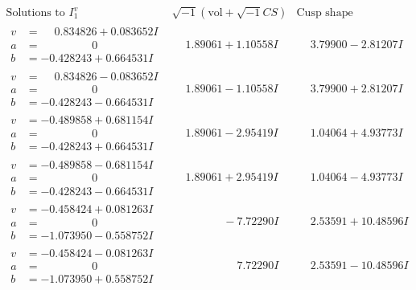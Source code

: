 \documentclass[1p]{elsarticle_modified}
\theoremstyle{definition}
\newcommand{\I}{\sqrt{-1}}
\begin{document}
$$\begin{array}{c|c|c}  
\text{Solutions to }I^v_{1}& \I (\text{vol} + \sqrt{-1}CS) & \text{Cusp shape}\\
 \hline 
\begin{aligned}
v &= \phantom{-}0.834826 + 0.083652 I \\
a &= \phantom{-0.000000 } 0 \\
b &= -0.428243 + 0.664531 I\end{aligned}
 & \phantom{-}1.89061 + 1.10558 I & \phantom{-}3.79900 - 2.81207 I \\ \hline\begin{aligned}
v &= \phantom{-}0.834826 - 0.083652 I \\
a &= \phantom{-0.000000 } 0 \\
b &= -0.428243 - 0.664531 I\end{aligned}
 & \phantom{-}1.89061 - 1.10558 I & \phantom{-}3.79900 + 2.81207 I \\ \hline\begin{aligned}
v &= -0.489858 + 0.681154 I \\
a &= \phantom{-0.000000 } 0 \\
b &= -0.428243 + 0.664531 I\end{aligned}
 & \phantom{-}1.89061 - 2.95419 I & \phantom{-}1.04064 + 4.93773 I \\ \hline\begin{aligned}
v &= -0.489858 - 0.681154 I \\
a &= \phantom{-0.000000 } 0 \\
b &= -0.428243 - 0.664531 I\end{aligned}
 & \phantom{-}1.89061 + 2.95419 I & \phantom{-}1.04064 - 4.93773 I \\ \hline\begin{aligned}
v &= -0.458424 + 0.081263 I \\
a &= \phantom{-0.000000 } 0 \\
b &= -1.073950 - 0.558752 I\end{aligned}
 & \phantom{-0.000000 } -7.72290 I & \phantom{-}2.53591 + 10.48596 I \\ \hline\begin{aligned}
v &= -0.458424 - 0.081263 I \\
a &= \phantom{-0.000000 } 0 \\
b &= -1.073950 + 0.558752 I\end{aligned}
 & \phantom{-0.000000 -}7.72290 I & \phantom{-}2.53591 - 10.48596 I \\ \hline\begin{aligned}

\end{aligned}
\end{array}$$
\end{document}
